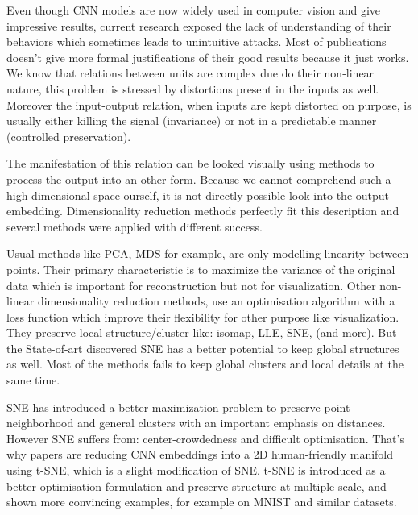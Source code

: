 \documentclass[a4paper,12pt]{report}
\begin{document}
Even though CNN models are now widely used in computer vision and give impressive results, current research exposed the lack of understanding of their behaviors which sometimes leads to unintuitive attacks\cite{szegedy2013intriguing}.
Most of publications doesn't give more formal justifications of their good results because it just works. %
We know that relations between units are complex due do their non-linear nature, this problem is stressed by distortions present in the inputs as well.
Moreover the input-output relation, when inputs are kept distorted on purpose, is usually either killing the signal (invariance) or not in a predictable manner (controlled preservation).



The manifestation of this relation can be looked visually using methods to process the output into an other form.
Because we cannot comprehend such a high dimensional space ourself, it is not directly possible look into the output embedding.
Dimensionality reduction methods perfectly fit this description and several methods were applied with different success.

Usual methods like PCA, MDS for example, are only modelling linearity between points.
Their primary characteristic is to maximize the variance of the original data which is important for reconstruction but not for visualization.
Other non-linear dimensionality reduction methods, use an optimisation algorithm with a loss function which improve their flexibility for other purpose like visualization.
They preserve local structure/cluster like: isomap, LLE, SNE, (and more).
But the State-of-art discovered SNE has a better potential to keep global structures as well\cite{SNE}.
Most of the methods fails to keep global clusters and local details at the same time\cite{t-SNE}.

SNE has introduced a better maximization problem to preserve point neighborhood and general clusters with an important emphasis on distances\cite{SNE}.
However SNE suffers from: center-crowdedness and difficult optimisation.
That's why papers are reducing CNN embeddings into a 2D human-friendly manifold using t-SNE, which is a slight modification of SNE. %
t-SNE is introduced as a better optimisation formulation and preserve structure at multiple scale, and shown more convincing examples, for example on MNIST\cite{t-SNE} and similar datasets\cite{van2009new}.
\end{document}
